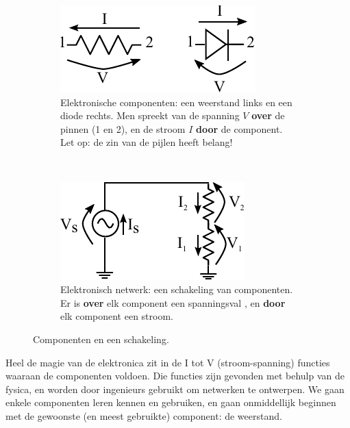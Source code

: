 \documentclass{article}
\begin{document}
		\begin{figure}[hbtp]
			\centering
			\begin{subfigure}[b]{0.5\linewidth}
				\centering
				\includegraphics{componenten}
				\caption{Elektronische componenten: een weerstand links en een diode rechts. Men spreekt van de spanning $V$ \textbf{over} de pinnen (1 en 2), en de stroom $I$ \textbf{door} de component. Let op: de zin van de pijlen heeft belang!}
				\label{subfig:componenten}
			\end{subfigure}
			~
			\begin{subfigure}[b]{0.5\linewidth}
				\centering
				\includegraphics{weerstandsdeler}
				\caption{Elektronisch netwerk: een schakeling van componenten. Er is \textbf{over} elk component een spanningsval , en \textbf{door} elk component een stroom.}
				\label{subfig:netwerk}
			\end{subfigure}
			\caption{Componenten en een schakeling. }
			\label{fig:component_en_schakeling}
		\end{figure}

		Heel de magie van de elektronica zit in de I tot V (stroom-spanning) functies waaraan de componenten voldoen. Die functies zijn gevonden met behulp van de fysica, en worden door ingenieurs gebruikt om netwerken te ontwerpen. We gaan enkele componenten leren kennen en gebruiken, en gaan onmiddellijk beginnen met de gewoonste (en meest gebruikte) component: de weerstand.

\end{document}
